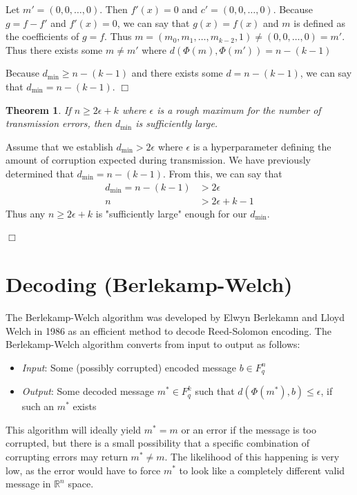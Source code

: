 \documentclass{article}
\newtheorem{theorem}{Theorem}
\newenvironment{proof}{\noindent{\em Proof:}}{$\Box$~\\}
\begin{document}
\begin{proof}
\begin{enumerate}
        Let $m'=(0,0,\dots ,0)$. Then $f'(x)=0$ and $c'=(0,0,\dots,0)$. Because $g=f-f'$ and $f'(x)=0$, we can say that $g(x)=f(x)$ and $m$ is defined as the coefficients of $g=f$. Thus $m=(m_0,m_1,\dots,m_{k-2},1)\neq(0,0,\dots,0)=m'$. Thus there exists some $m\neq m'$ where $d(\Phi(m),\Phi(m'))=n-(k-1)$
        \end{enumerate}
        Because $d_\text{min}\geq n-(k-1)$ and there exists some $d=n-(k-1)$, we can say that $d_\text{min}=n-(k-1)$.
\end{proof}

\begin{theorem}
    If $n\geq2\epsilon+k$ where $\epsilon$ is a rough maximum for the number of transmission errors, then $d_\text{min}$ is sufficiently large.
\end{theorem}

\begin{proof}
    Assume that we establish $d_\text{min}>2\epsilon$ where $\epsilon$ is a hyperparameter defining the amount of corruption expected during transmission. We have previously determined that $d_\text{min}=n-(k-1)$. From this, we can say that
    \begin{align*}
        d_\text{min} = n-(k-1) &> 2\epsilon\\
        n &> 2\epsilon+k-1
    \end{align*}
    Thus any $n\geq 2\epsilon+k$ is "sufficiently large" enough for our $d_\text{min}$.
    
\end{proof}

\section{Decoding (Berlekamp-Welch)}

The Berlekamp-Welch algorithm was developed by Elwyn Berlekamn and Lloyd Welch in 1986 as an efficient method to decode Reed-Solomon encoding. The Berlekamp-Welch algorithm converts from input to output as follows:
\begin{itemize}
    \item \textit{Input}: Some (possibly corrupted) encoded message $b\in F_q^n$
    \item \textit{Output}: Some decoded message $m^*\in F_q^k$ such that $d(\Phi(m^*),b)\leq \epsilon$, if such an $m^*$ exists
\end{itemize}
This algorithm will ideally yield $m^*=m$ or an error if the message is too corrupted, but there is a small possibility that a specific combination of corrupting errors may return $m^*\neq m$. The likelihood of this happening is very low, as the error would have to force $m^*$ to look like a completely different valid message in $\mathbb{R}^n$ space.
\end{document}
